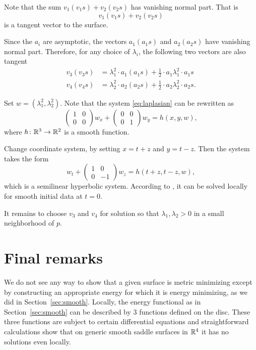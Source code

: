 \documentclass{article}
\begin{document}
Note that the sum $v_1(v_1s)+v_2(v_2s)$ has vanishing normal part.
That is \[v_1(v_1s)+v_2(v_2s)\] is a tangent vector to the surface.

Since the $a_i$ are asymptotic,
the vectors $a_1(a_1s)$ and $a_2(a_2s)$ have vanishing normal part.
Therefore, for any choice of $\lambda_i$,
the following two vectors are also tangent
\begin{align*}
v_3(v_3s)&=\lambda_1^2\cdot a_1(a_1s)+\tfrac12\cdot a_1\lambda_1^2\cdot a_1s
\\
v_4(v_4s)&=\lambda_2^2\cdot a_2(a_2s)+\tfrac12\cdot a_2\lambda_2^2\cdot a_2s.
\end{align*}

Set $w=(\lambda_1^2,\lambda_2^2)$.
Note that the system \ref{eq:laplasian} can be rewritten as 
\[\left(\begin{smallmatrix}
   1&0\\0&0
  \end{smallmatrix}\right)
w_x
+
\left(\begin{smallmatrix}
   0&0\\0&1
  \end{smallmatrix}\right)
w_y=h(x,y,w),\]
where $h\colon\mathbb{R}^3\to\mathbb{R}^2$ is a smooth function.

Change coordinate system, by setting $x=t+z$ and $y=t-z$.
Then the system takes the form 
\[w_t+\left(\begin{smallmatrix}
   1&0\\0&-1
  \end{smallmatrix}\right)
w_z=h(t+z,t-z,w),\]
which is a semilinear hyperbolic system.
According to \cite[Theorem 3.6]{bressan}, it can be solved locally for smooth initial data at $t=0$.

It remains to choose $v_3$ and $v_4$ for solution so that $\lambda_1, \lambda_2>0$ in a small neighborhood of $p$.
\qeds


\section{Final remarks}\label{Final remarks}

We do not see any way to show that a given surface is metric minimizing except by constructing an appropriate energy for which it is energy minimizing, as we did in Section~\ref{sec:smooth}.
Locally, the energy functional as in Section~\ref{sec:smooth} can be described by 3 functions defined on the disc.
These three functions are subject to certain differential equations and 
straightforward calculations show that on generic smooth saddle surfaces in $\mathbb{R}^4$ 
it has no solutions even locally.
\end{document}

